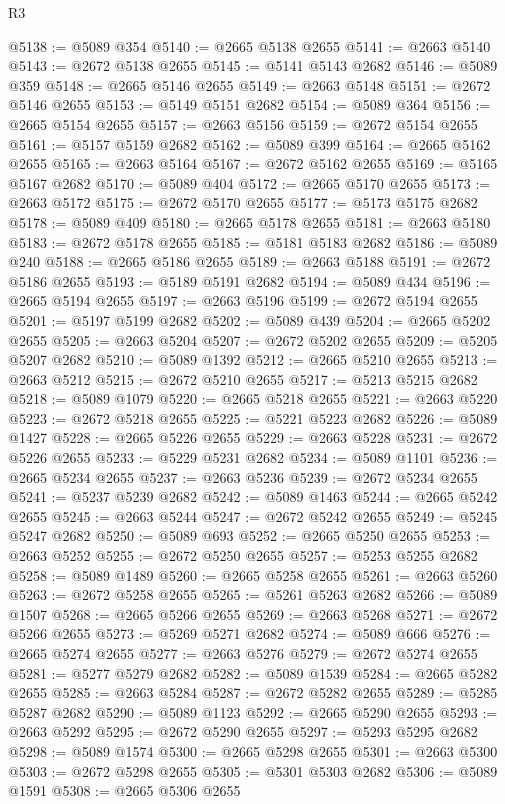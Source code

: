 \begin{lexlean}{R3}
\begin{coremodule}
@5138 := @5089 @354
@5140 := @2665 @5138 @2655
@5141 := @2663 @5140
@5143 := @2672 @5138 @2655
@5145 := @5141 @5143 @2682
@5146 := @5089 @359
@5148 := @2665 @5146 @2655
@5149 := @2663 @5148
@5151 := @2672 @5146 @2655
@5153 := @5149 @5151 @2682
@5154 := @5089 @364
@5156 := @2665 @5154 @2655
@5157 := @2663 @5156
@5159 := @2672 @5154 @2655
@5161 := @5157 @5159 @2682
@5162 := @5089 @399
@5164 := @2665 @5162 @2655
@5165 := @2663 @5164
@5167 := @2672 @5162 @2655
@5169 := @5165 @5167 @2682
@5170 := @5089 @404
@5172 := @2665 @5170 @2655
@5173 := @2663 @5172
@5175 := @2672 @5170 @2655
@5177 := @5173 @5175 @2682
@5178 := @5089 @409
@5180 := @2665 @5178 @2655
@5181 := @2663 @5180
@5183 := @2672 @5178 @2655
@5185 := @5181 @5183 @2682
@5186 := @5089 @240
@5188 := @2665 @5186 @2655
@5189 := @2663 @5188
@5191 := @2672 @5186 @2655
@5193 := @5189 @5191 @2682
@5194 := @5089 @434
@5196 := @2665 @5194 @2655
@5197 := @2663 @5196
@5199 := @2672 @5194 @2655
@5201 := @5197 @5199 @2682
@5202 := @5089 @439
@5204 := @2665 @5202 @2655
@5205 := @2663 @5204
@5207 := @2672 @5202 @2655
@5209 := @5205 @5207 @2682
@5210 := @5089 @1392
@5212 := @2665 @5210 @2655
@5213 := @2663 @5212
@5215 := @2672 @5210 @2655
@5217 := @5213 @5215 @2682
@5218 := @5089 @1079
@5220 := @2665 @5218 @2655
@5221 := @2663 @5220
@5223 := @2672 @5218 @2655
@5225 := @5221 @5223 @2682
@5226 := @5089 @1427
@5228 := @2665 @5226 @2655
@5229 := @2663 @5228
@5231 := @2672 @5226 @2655
@5233 := @5229 @5231 @2682
@5234 := @5089 @1101
@5236 := @2665 @5234 @2655
@5237 := @2663 @5236
@5239 := @2672 @5234 @2655
@5241 := @5237 @5239 @2682
@5242 := @5089 @1463
@5244 := @2665 @5242 @2655
@5245 := @2663 @5244
@5247 := @2672 @5242 @2655
@5249 := @5245 @5247 @2682
@5250 := @5089 @693
@5252 := @2665 @5250 @2655
@5253 := @2663 @5252
@5255 := @2672 @5250 @2655
@5257 := @5253 @5255 @2682
@5258 := @5089 @1489
@5260 := @2665 @5258 @2655
@5261 := @2663 @5260
@5263 := @2672 @5258 @2655
@5265 := @5261 @5263 @2682
@5266 := @5089 @1507
@5268 := @2665 @5266 @2655
@5269 := @2663 @5268
@5271 := @2672 @5266 @2655
@5273 := @5269 @5271 @2682
@5274 := @5089 @666
@5276 := @2665 @5274 @2655
@5277 := @2663 @5276
@5279 := @2672 @5274 @2655
@5281 := @5277 @5279 @2682
@5282 := @5089 @1539
@5284 := @2665 @5282 @2655
@5285 := @2663 @5284
@5287 := @2672 @5282 @2655
@5289 := @5285 @5287 @2682
@5290 := @5089 @1123
@5292 := @2665 @5290 @2655
@5293 := @2663 @5292
@5295 := @2672 @5290 @2655
@5297 := @5293 @5295 @2682
@5298 := @5089 @1574
@5300 := @2665 @5298 @2655
@5301 := @2663 @5300
@5303 := @2672 @5298 @2655
@5305 := @5301 @5303 @2682
@5306 := @5089 @1591
@5308 := @2665 @5306 @2655

\end{coremodule}
\end{lexlean}
